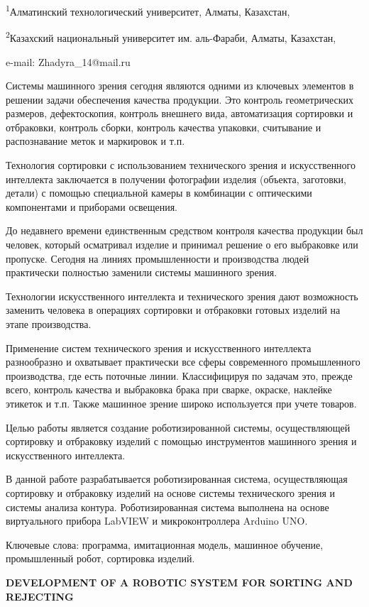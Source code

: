 \textsuperscript{1}Алматинский технологический университет, Алматы,
Казахстан,

\textsuperscript{2}Казахский национальный университет им. аль-Фараби,
Алматы, Казахстан,

e-mail: Zhadyra\_14@mail.ru

Системы машинного зрения сегодня являются одними из ключевых элементов в
решении задачи обеспечения качества продукции. Это контроль
геометрических размеров, дефектоскопия, контроль внешнего вида,
автоматизация сортировки и отбраковки, контроль сборки, контроль
качества упаковки, считывание и распознавание меток и маркировок и т.п.

Технология сортировки с использованием технического зрения и
искусственного интеллекта заключается в получении фотографии изделия
(объекта, заготовки, детали) с помощью специальной камеры в комбинации с
оптическими компонентами и приборами освещения.

До недавнего времени единственным средством контроля качества продукции
был человек, который осматривал изделие и принимал решение о его
выбраковке или пропуске. Сегодня на линиях промышленности и производства
людей практически полностью заменили системы машинного зрения.

Технологии искусственного интеллекта и технического зрения дают
возможность заменить человека в операциях сортировки и отбраковки
готовых изделий на этапе производства.

Применение систем технического зрения и искусственного интеллекта
разнообразно и охватывает практически все сферы современного
промышленного производства, где есть поточные линии. Классифицируя по
задачам это, прежде всего, контроль качества и выбраковка брака при
сварке, окраске, наклейке этикеток и т.п. Также машинное зрение широко
используется при учете товаров.

Целью работы является создание роботизированной системы, осуществляющей
сортировку и отбраковку изделий с помощью инструментов машинного зрения
и искусственного интеллекта.

В данной работе разрабатывается роботизированная система, осуществляющая
сортировку и отбраковку изделий на основе системы технического зрения и
системы анализа контура. Роботизированная система выполнена на основе
виртуального прибора LabVIEW и микроконтроллера Arduino UNO.

Ключевые слова: программа, имитационная модель, машинное обучение,
промышленный робот, сортировка изделий.

{\bfseries DEVELOPMENT OF A ROBOTIC SYSTEM FOR SORTING AND REJECTING}

